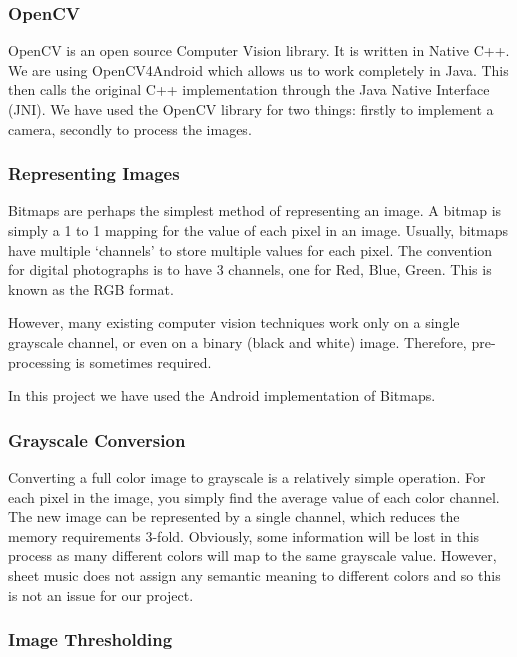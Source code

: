         \subsubsection{OpenCV}
            OpenCV\cite{OpenCV} is an open source Computer Vision library. It is written in Native C++. We are using OpenCV4Android\cite{OpenCV4Android} which allows us to work completely in Java. This then calls the original C++ implementation through the Java Native Interface (JNI)\cite{JNI}. We have used the OpenCV library for two things: firstly to implement a camera, secondly to process the images.

        \subsubsection{Representing Images}

Bitmaps are perhaps the simplest method of representing an image. A bitmap is simply a 1 to 1 mapping for the value of each pixel in an image. Usually, bitmaps have multiple ‘channels’ to store multiple values for each pixel. The convention for digital photographs is to have 3 channels, one for Red, Blue, Green. This is known as the RGB format.

However, many existing computer vision techniques work only on a single grayscale channel, or even on a binary (black and white) image. Therefore, pre-processing is sometimes required.

In this project we have used the Android implementation of Bitmaps\cite{Bitmap}.

        \subsubsection{Grayscale Conversion}

Converting a full color image to grayscale is a relatively simple operation. For each pixel in the image, you simply find the average value of each color channel. The new image can be represented by a single channel, which reduces the memory requirements 3-fold. Obviously, some information will be lost in this process as many different colors will map to the same grayscale value. However, sheet music does not assign any semantic meaning to different colors and so this is not an issue for our project.

        \subsubsection{Image Thresholding}


